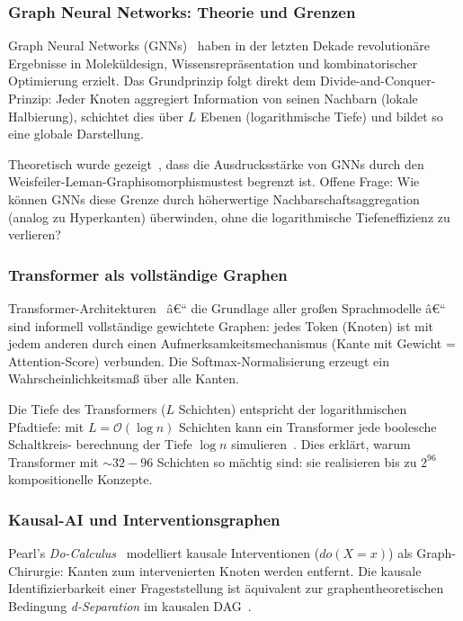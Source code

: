 ﻿\documentclass[12pt,a4paper,twoside]{article}
\theoremstyle{definition}
\theoremstyle{plain}
\theoremstyle{remark}
\begin{document}
\subsubsection{Graph Neural Networks: Theorie und Grenzen}

Graph Neural Networks (GNNs)~\cite{Kipf2017, Velickovic2018}
haben in der letzten Dekade revolutionäre Ergebnisse in
Moleküldesign, Wissensrepräsentation und kombinatorischer
Optimierung erzielt.  Das Grundprinzip folgt direkt dem
Divide-and-Conquer-Prinzip:  Jeder Knoten aggregiert
Information von seinen Nachbarn (lokale Halbierung),
schichtet dies über $L$ Ebenen (logarithmische Tiefe)
und bildet so eine globale Darstellung.

Theoretisch wurde gezeigt~\cite{Xu2019}, dass die
Ausdrucksstärke von GNNs durch den
Weisfeiler-Leman-Graphisomorphismustest begrenzt ist.
Offene Frage: Wie können GNNs diese Grenze durch
höherwertige Nachbarschaftsaggregation (analog zu
Hyperkanten) überwinden, ohne die logarithmische
Tiefeneffizienz zu verlieren?

\subsubsection{Transformer als vollständige Graphen}

Transformer-Architekturen~\cite{Vaswani2017} â€“ die Grundlage
aller großen Sprachmodelle â€“ sind informell vollständige
gewichtete Graphen: jedes Token (Knoten) ist mit jedem anderen
durch einen Aufmerksamkeitsmechanismus (Kante mit Gewicht =
Attention-Score) verbunden.  Die Softmax-Normalisierung
erzeugt ein Wahrscheinlichkeitsmaß über alle Kanten.

Die Tiefe des Transformers ($L$ Schichten) entspricht der
logarithmischen Pfadtiefe: mit $L = \mathcal{O}(\log n)$
Schichten kann ein Transformer jede boolesche Schaltkreis-
berechnung der Tiefe $\log n$ simulieren~\cite{Perez2021}.
Dies erklärt, warum Transformer mit $\sim 32{-}96$ Schichten
so mächtig sind: sie realisieren bis zu $2^{96}$
kompositionelle Konzepte.

\subsubsection{Kausal-AI und Interventionsgraphen}

Pearl's \emph{Do-Calculus}~\cite{Pearl2009} modelliert
kausale Interventionen ($do(X=x)$) als Graph-Chirurgie:
Kanten zum intervenierten Knoten werden entfernt.  Die
kausale Identifizierbarkeit einer Frageststellung ist
äquivalent zur graphentheoretischen Bedingung
\emph{d-Separation} im kausalen DAG~\cite{Verma1988}.
\end{document}
